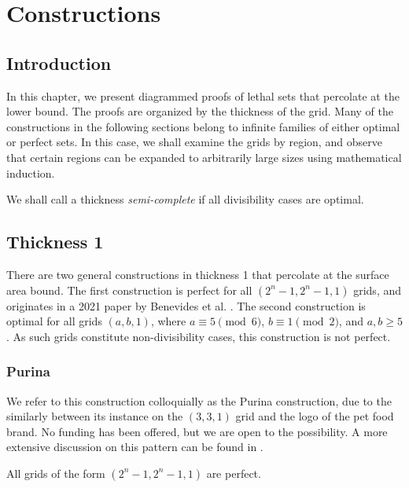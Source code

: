 \chapter{Constructions}

\section{Introduction}

In this chapter, we present diagrammed proofs of lethal sets that percolate at the lower bound. The proofs are organized by the thickness of the grid. Many of the constructions in the following sections belong to infinite families of either optimal or perfect sets. In this case, we shall examine the grids by region, and observe that certain regions can be expanded to arbitrarily large sizes using mathematical induction. 

We shall call a thickness \emph{semi-complete} if all divisibility cases are optimal.

\section{Thickness 1}

There are two general constructions in thickness 1 that percolate at the surface area bound. The first construction is perfect for all $(2^n-1, 2^n-1, 1)$ grids, and originates in a 2021 paper by Benevides et al. \cite{benevides:2021}. The second construction is optimal for all grids $(a,b,1)$, where $a \equiv 5 \pmod 6$, $b \equiv 1 \pmod 2$, and $a,b \geq 5$. As such grids constitute non-divisibility cases, this construction is not perfect.

\subsection{Purina}

We refer to this construction colloquially as the Purina construction, due to the similarly between its instance on the $(3,3,1)$ grid and the logo of the pet food brand. No funding has been offered, but we are open to the possibility. A more extensive discussion on this pattern can be found in \cite{benevides:2021}.

\begin{con}
\label{con:purina}
All grids of the form $(2^n-1, 2^n-1, 1)$ are perfect.
\end{con}

